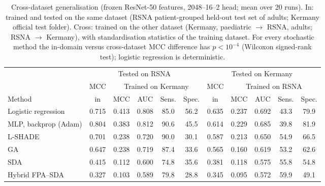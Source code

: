 \begin{table}[!t]
\centering
\caption{Cross-dataset generalisation (frozen ResNet-50 features, 2048--16--2 head; mean over 20 runs). In: trained and tested on the same dataset (RSNA patient-grouped held-out test set of adults; Kermany official test folder). Cross: trained on the other dataset (Kermany, paediatric $\rightarrow$ RSNA, adults; RSNA $\rightarrow$ Kermany), with standardisation statistics of the training dataset. For every stochastic method the in-domain versus cross-dataset MCC difference has $p<10^{-4}$ (Wilcoxon signed-rank test); logistic regression is deterministic.}
\label{tab:cross}
\footnotesize
\setlength{\tabcolsep}{3pt}
\begin{tabular}{lcccccccccc}
\toprule
 & \multicolumn{5}{c}{Tested on RSNA} & \multicolumn{5}{c}{Tested on Kermany} \\
 & MCC & \multicolumn{4}{c}{Trained on Kermany} & MCC & \multicolumn{4}{c}{Trained on RSNA} \\
Method & in & MCC & AUC & Sens. & Spec. & in & MCC & AUC & Sens. & Spec. \\
\midrule
Logistic regression & 0.715 & 0.413 & 0.808 & 85.0 & 56.2 & 0.635 & 0.237 & 0.692 & 43.3 & 79.9 \\
MLP, backprop (Adam) & 0.804 & 0.383 & 0.812 & 90.6 & 45.5 & 0.614 & 0.229 & 0.685 & 39.8 & 81.9 \\
L-SHADE & 0.701 & 0.238 & 0.720 & 90.0 & 30.1 & 0.587 & 0.213 & 0.650 & 54.9 & 66.5 \\
GA & 0.647 & 0.238 & 0.719 & 87.4 & 33.6 & 0.565 & 0.160 & 0.619 & 53.2 & 62.6 \\
SDA & 0.415 & 0.112 & 0.600 & 74.8 & 35.6 & 0.381 & 0.118 & 0.575 & 55.8 & 54.8 \\
Hybrid FPA--SDA & 0.327 & 0.103 & 0.589 & 79.8 & 28.8 & 0.345 & 0.095 & 0.572 & 59.9 & 49.1 \\
\bottomrule
\end{tabular}
\end{table}
